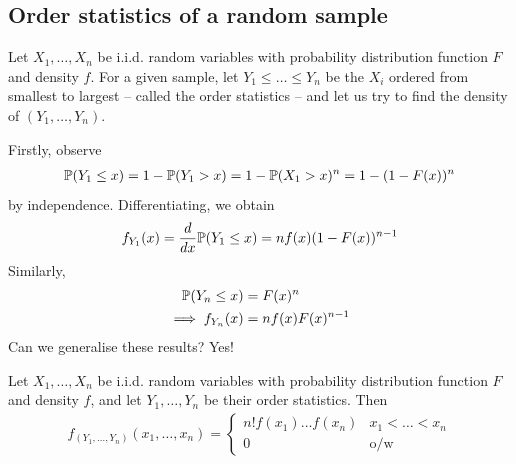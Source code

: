 \documentclass{../../template/note}
\begin{document}
    \subsection{Order statistics of a random sample}
    
    Let \(X_1, \dots, X_n\) be i.i.d. random variables with probability distribution function \(F\) and density \(f\). For a given sample, let \(Y_1 \leq \dots \leq Y_n\) be the \(X_i\) ordered from smallest to largest -- called the order statistics -- and let us try to find the density of \((Y_1, \dots, Y_n)\).

    Firstly, observe
    \begin{align*}
        \mathbb P(Y_1 \leq x) = 1 - \mathbb P(Y_1 > x) = 1 - \mathbb P(X_1 > x)^n = 1 - (1-F(x))^n
    \end{align*}
    by independence. Differentiating, we obtain
    \begin{align*}
        f_{Y_1}(x) = \frac d {dx} \mathbb P(Y_1 \leq x) = nf(x)(1-F(x))^{n-1}
    \end{align*}
    Similarly,
    \begin{align*}
        \mathbb P(Y_n \leq x) &= F(x)^n \\
        \implies f_{Y_n}(x) &= nf(x)F(x)^{n-1}
    \end{align*}
    Can we generalise these results? Yes!
    \begin{proposition}
        Let \(X_1, \dots, X_n\) be i.i.d. random variables with probability distribution function \(F\) and density \(f\), and let \(Y_1, \dots, Y_n\) be their order statistics. Then
        \begin{align*}
            f_{(Y_1, \dots, Y_n)}(x_1, \dots, x_n) = \begin{cases}
                n!f(x_1) \dots f(x_n) & x_1 < \dots < x_n \\
                0 & \text{o/w}
            \end{cases}
        \end{align*}
    \end{proposition}
\end{document}
